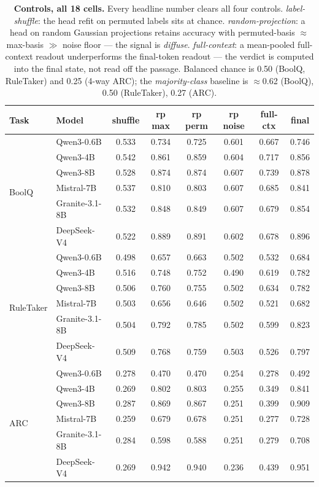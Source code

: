 \begin{table}[t]
\centering
\caption{\textbf{Controls, all 18 cells.} Every headline number clears all
four controls. \emph{label-shuffle}: the head refit on permuted labels sits at
chance. \emph{random-projection}: a head on random Gaussian projections
retains accuracy with permuted-basis $\approx$ max-basis $\gg$ noise floor ---
the signal is \emph{diffuse}. \emph{full-context}: a mean-pooled full-context
readout underperforms the final-token readout --- the verdict is computed into
the final state, not read off the passage. Balanced chance is 0.50 (BoolQ,
RuleTaker) and 0.25 (4-way ARC); the \emph{majority-class} baseline is
$\approx$0.62 (BoolQ), 0.50 (RuleTaker), 0.27 (ARC).}
\label{tab:controls}
\small
\setlength{\tabcolsep}{4pt}%
\begin{tabular}{@{}llcccccc@{}}
\toprule
Task & Model & shuffle & rp max & rp perm & rp noise & full-ctx & final \\
\midrule
\multirow{6}{*}{BoolQ}
  & Qwen3-0.6B & 0.533 & 0.734 & 0.725 & 0.601 & 0.667 & 0.746 \\
  & Qwen3-4B & 0.542 & 0.861 & 0.859 & 0.604 & 0.717 & 0.856 \\
  & Qwen3-8B & 0.528 & 0.874 & 0.874 & 0.607 & 0.739 & 0.878 \\
  & Mistral-7B & 0.537 & 0.810 & 0.803 & 0.607 & 0.685 & 0.841 \\
  & Granite-3.1-8B & 0.532 & 0.848 & 0.849 & 0.607 & 0.679 & 0.854 \\
  & DeepSeek-V4 & 0.522 & 0.889 & 0.891 & 0.602 & 0.678 & 0.896 \\
\midrule
\multirow{6}{*}{RuleTaker}
  & Qwen3-0.6B & 0.498 & 0.657 & 0.663 & 0.502 & 0.532 & 0.684 \\
  & Qwen3-4B & 0.516 & 0.748 & 0.752 & 0.490 & 0.619 & 0.782 \\
  & Qwen3-8B & 0.506 & 0.760 & 0.755 & 0.502 & 0.634 & 0.782 \\
  & Mistral-7B & 0.503 & 0.656 & 0.646 & 0.502 & 0.521 & 0.682 \\
  & Granite-3.1-8B & 0.504 & 0.792 & 0.785 & 0.502 & 0.599 & 0.823 \\
  & DeepSeek-V4 & 0.509 & 0.768 & 0.759 & 0.503 & 0.526 & 0.797 \\
\midrule
\multirow{6}{*}{ARC}
  & Qwen3-0.6B & 0.278 & 0.470 & 0.470 & 0.254 & 0.278 & 0.492 \\
  & Qwen3-4B & 0.269 & 0.802 & 0.803 & 0.255 & 0.349 & 0.841 \\
  & Qwen3-8B & 0.287 & 0.869 & 0.867 & 0.251 & 0.399 & 0.909 \\
  & Mistral-7B & 0.259 & 0.679 & 0.678 & 0.251 & 0.277 & 0.728 \\
  & Granite-3.1-8B & 0.284 & 0.598 & 0.588 & 0.251 & 0.279 & 0.708 \\
  & DeepSeek-V4 & 0.269 & 0.942 & 0.940 & 0.236 & 0.439 & 0.951 \\
\bottomrule
\end{tabular}
\end{table}
